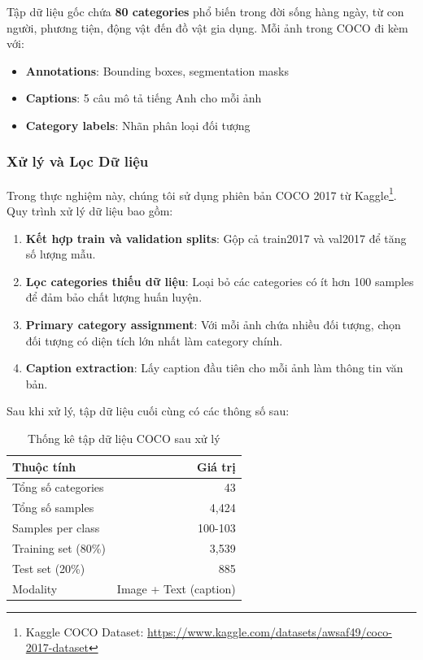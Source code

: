 Tập dữ liệu gốc chứa \textbf{80 categories} phổ biến trong đời sống hàng ngày, từ con người, phương tiện, động vật đến đồ vật gia dụng. Mỗi ảnh trong COCO đi kèm với:
\begin{itemize}
    \item \textbf{Annotations}: Bounding boxes, segmentation masks
    \item \textbf{Captions}: 5 câu mô tả tiếng Anh cho mỗi ảnh
    \item \textbf{Category labels}: Nhãn phân loại đối tượng
\end{itemize}

\subsubsection{Xử lý và Lọc Dữ liệu}
Trong thực nghiệm này, chúng tôi sử dụng phiên bản COCO 2017 từ Kaggle\footnote{Kaggle COCO Dataset: \url{https://www.kaggle.com/datasets/awsaf49/coco-2017-dataset}}. Quy trình xử lý dữ liệu bao gồm:

\begin{enumerate}
    \item \textbf{Kết hợp train và validation splits}: Gộp cả train2017 và val2017 để tăng số lượng mẫu.
    \item \textbf{Lọc categories thiếu dữ liệu}: Loại bỏ các categories có ít hơn 100 samples để đảm bảo chất lượng huấn luyện.
    \item \textbf{Primary category assignment}: Với mỗi ảnh chứa nhiều đối tượng, chọn đối tượng có diện tích lớn nhất làm category chính.
    \item \textbf{Caption extraction}: Lấy caption đầu tiên cho mỗi ảnh làm thông tin văn bản.
\end{enumerate}

Sau khi xử lý, tập dữ liệu cuối cùng có các thông số sau:

\begin{table}[H]
    \centering
    \caption{Thống kê tập dữ liệu COCO sau xử lý}
    \begin{tabular}{|l|r|}
        \hline
        \textbf{Thuộc tính} & \textbf{Giá trị} \\
        \hline
        Tổng số categories & 43 \\
        \hline
        Tổng số samples & 4,424 \\
        \hline
        Samples per class & 100-103 \\
        \hline
        Training set (80\%) & 3,539 \\
        \hline
        Test set (20\%) & 885 \\
        \hline
        Modality & Image + Text (caption) \\
        \hline
    \end{tabular}
    \label{tab:coco-stats}
\end{table}

